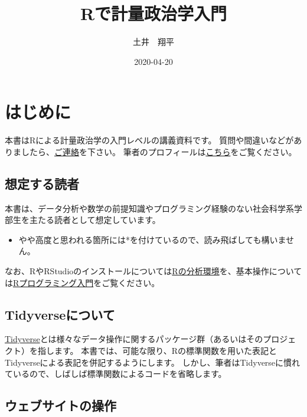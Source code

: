 \documentclass[]{bxjsreport}
\title{Rで計量政治学入門}
\author{土井　翔平}
\date{2020-04-20}
\providecommand{\tightlist}{%
  \setlength{\itemsep}{0pt}\setlength{\parskip}{0pt}}
\let\asdf\section
\renewcommand{\section}{\chapter}
\renewcommand{\subsection}{\asdf}
\begin{document}
\maketitle

{
\setcounter{tocdepth}{1}
\tableofcontents
}
\hypertarget{index}{%
\section*{はじめに}\label{index}}

本書はRによる計量政治学の入門レベルの講義資料です。
質問や間違いなどがありましたら、\href{mailto:shohei.doi0504@gmail.com}{ご連絡}を下さい。
筆者のプロフィールは\href{https://shohei-doi.github.io/}{こちら}をご覧ください。

\hypertarget{ux60f3ux5b9aux3059ux308bux8aadux8005}{%
\subsection*{想定する読者}\label{ux60f3ux5b9aux3059ux308bux8aadux8005}}

本書は、データ分析や数学の前提知識やプログラミング経験のない社会科学系学部生を主たる読者として想定しています。

\begin{itemize}
\tightlist
\item
  やや高度と思われる箇所には*を付けているので、読み飛ばしても構いません。
\end{itemize}

なお、RやRStudioのインストールについては\protect\hyperlink{install-r}{Rの分析環境}を、基本操作については\protect\hyperlink{intro-r}{Rプログラミング入門}をご覧ください。

\hypertarget{tidyverseux306bux3064ux3044ux3066}{%
\subsection*{Tidyverseについて}\label{tidyverseux306bux3064ux3044ux3066}}

\href{https://www.tidyverse.org/}{Tidyverse}とは様々なデータ操作に関するパッケージ群（あるいはそのプロジェクト）を指します。
本書では、可能な限り、Rの標準関数を用いた表記とTidyverseによる表記を併記するようにします。
しかし、筆者はTidyverseに慣れているので、しばしば標準関数によるコードを省略します。

\hypertarget{ux30a6ux30a7ux30d6ux30b5ux30a4ux30c8ux306eux64cdux4f5c}{%
\subsection*{ウェブサイトの操作}\label{ux30a6ux30a7ux30d6ux30b5ux30a4ux30c8ux306eux64cdux4f5c}}
\end{document}
